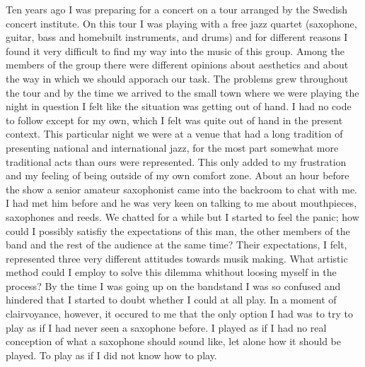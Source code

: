 \documentclass[a4paper]{article}
\begin{document}
Ten years ago I was preparing for a concert on a tour arranged by the Swedish concert institute. On this tour I was playing with a free jazz quartet (saxophone, guitar, bass and homebuilt instruments, and drums) and for different reasons I found it very difficult to find my way into the music of this group. Among the members of the group there were different opinions about aesthetics and about the way in which we should apporach our task. The problems grew throughout the tour and by the time we arrived to the small town where we were playing the night in question I felt like the situation was getting out of hand. I had no code to follow except for my own, which I felt was quite out of hand in the present context. This particular night we were at a venue that had a long tradition of presenting national and international jazz, for the most part somewhat more traditional acts than ours were represented. This only added to my frustration and my feeling of being outside of my own comfort zone. About an hour before the show a senior amateur saxophonist came into the backroom to chat with me. I had met him before and he was very keen on talking to me about mouthpieces, saxophones and reeds. We chatted for a while but I started to feel the panic; how could I possibly satisfiy the expectations of this man, the other members of the band and the rest of the audience at the same time? Their expectations, I felt, represented three very different attitudes towards musik making. What artistic method could I employ to solve this dilemma whithout loosing myself in the process? By the time I was going up on the bandstand I was so confused and hindered that I started to doubt whether I could at all play. In a moment of clairvoyance, however, it occured to me that the only option I had was to try to play as if I had never seen a saxophone before. I played as if I had no real conception of what a saxophone should sound like, let alone how it should be played. To play as if I did not know how to play.

\end{document}
